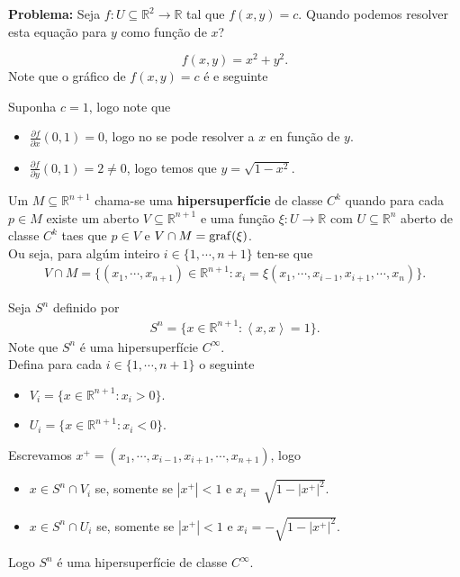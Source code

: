 \textbf{Problema:} Seja $f:U\subseteq \mathbb{R}^{2}\to\mathbb{R}$ tal que $f(x,y)=c$. Quando podemos resolver esta equação para $y$ como função de $x$?
\begin{example}
  $$f(x,y)=x^{2}+y^{2}.$$
  Note que o gráfico de $f(x,y)=c$ é e seguinte 
  \begin{center}
      
  \end{center}
  Suponha $c=1$, logo note que
  \begin{itemize}
    \item $\frac{\partial f}{\partial x}(0,1)=0$, logo no se pode resolver a $x$ en função de $y$.
    \item $\frac{\partial f}{\partial y}(0,1)=2\neq 0$, logo temos que $y=\sqrt{1-x^{2}}$.
  \end{itemize}
\end{example}
\begin{definition}[Hipersuperfície]
  Um $M\subseteq \mathbb{R}^{n+1}$ chama-se uma \textbf{hipersuperfície} de classe $C^{k}$ quando para cada $p\in M$ existe um aberto $V\subseteq \mathbb{R}^{n+1}$ e uma função $\xi:U\to\mathbb{R}$ com $U\subseteq\mathbb{R}^{n}$ aberto de classe $C^{k}$ taes que $p\in V$ e $V\cap M=\operatorname{graf}(\xi)$.\\
  Ou seja, para algúm inteiro $i\in\{1,\cdots,n+1\}$ ten-se que
  \begin{align*}
    V\cap M=\{(x_1,\cdots,x_{n+1})\in\mathbb{R}^{n+1}:x_i=\xi(x_1,\cdots,x_{i-1},x_{i+1},\cdots,x_n)\}.
  \end{align*}
\end{definition}
\begin{example}[$S^{n}$]
  Seja $S^{n}$ definido por
  \begin{align*}
    S^{n}=\{x\in\mathbb{R}^{n+1}:\left\langle x,x \right\rangle=1\}.
  \end{align*}
  Note que $S^{n}$ é uma hipersuperfície $C^{\infty}$.\\
  Defina para cada $i\in\{1,\cdots,n+1\}$ o seguinte
  \begin{itemize}
    \item $V_i=\{x\in\mathbb{R}^{n+1}:x_i>0\}$.
    \item $U_i=\{x\in\mathbb{R}^{n+1}:x_i<0\}$.
  \end{itemize}
  Escrevamos $x^{+}=(x_1,\cdots,x_{i-1},x_{i+1},\cdots,x_{n+1})$, logo
  \begin{itemize}
    \item $x\in S^{n}\cap V_i$ se, somente se $|x^{+}|<1$ e $x_i=\sqrt{1-|x^{+}|^{2}}$. 
    \item $x\in S^{n}\cap U_i$ se, somente se $|x^{+}|<1$ e $x_i=-\sqrt{1-|x^{+}|^{2}}$. 
  \end{itemize}
  Logo $S^{n}$ é uma hipersuperfície de classe $C^{\infty}$. 
\end{example}

